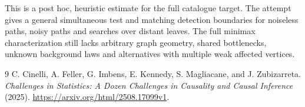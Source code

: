 \documentclass[11pt]{article}
\theoremstyle{remark}
\begin{document}
This is a post hoc, heuristic estimate for the full catalogue target.
The attempt gives a general simultaneous test and matching detection boundaries for noiseless paths, noisy paths and searches over distant leaves. The full minimax characterization still lacks arbitrary graph geometry, shared bottlenecks, unknown background laws and alternatives with multiple weak affected vertices.

\begin{thebibliography}{9}
 C. Cinelli, A. Feller, G. Imbens, E. Kennedy, S. Magliacane, and J. Zubizarreta. \emph{Challenges in Statistics: A Dozen Challenges in Causality and Causal Inference} (2025). \url{https://arxiv.org/html/2508.17099v1}.
\end{thebibliography}
\end{document}
